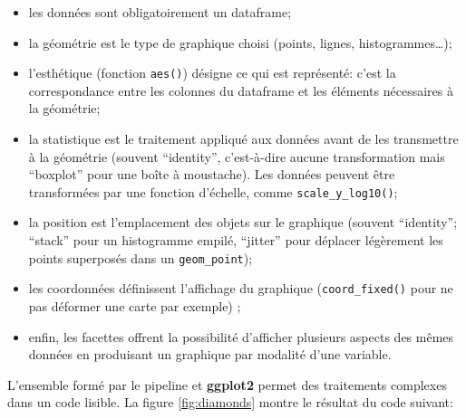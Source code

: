 \documentclass[
  12pt,
  french,
  a4paper,
  extrafontsizes,onecolumn,openright
  ]{memoir}
\newenvironment{Shaded}{\begin{snugshade}}{\end{snugshade}}
\newcommand{\CommentTok}[1]{\textcolor[rgb]{0.56,0.35,0.01}{\textit{#1}}}
\newcommand{\DataTypeTok}[1]{\textcolor[rgb]{0.13,0.29,0.53}{#1}}
\newcommand{\FloatTok}[1]{\textcolor[rgb]{0.00,0.00,0.81}{#1}}
\newcommand{\KeywordTok}[1]{\textcolor[rgb]{0.13,0.29,0.53}{\textbf{#1}}}
\newcommand{\NormalTok}[1]{#1}
\newcommand{\OperatorTok}[1]{\textcolor[rgb]{0.81,0.36,0.00}{\textbf{#1}}}
\newcommand{\StringTok}[1]{\textcolor[rgb]{0.31,0.60,0.02}{#1}}
\providecommand{\tightlist}{%
  \setlength{\itemsep}{0pt}\setlength{\parskip}{0pt}}
\begin{document}
\begin{itemize}
\tightlist
\item
  les données sont obligatoirement un dataframe;
\item
  la géométrie est le type de graphique choisi (points, lignes, histogrammes\ldots);
\item
  l'esthétique (fonction \texttt{aes()}) désigne ce qui est représenté: c'est la correspondance entre les colonnes du dataframe et les éléments nécessaires à la géométrie;
\item
  la statistique est le traitement appliqué aux données avant de les transmettre à la géométrie (souvent \enquote{identity}, c'est-à-dire aucune transformation mais \enquote{boxplot} pour une boîte à moustache).
  Les données peuvent être transformées par une fonction d'échelle, comme \texttt{scale\_y\_log10()};
\item
  la position est l'emplacement des objets sur le graphique (souvent \enquote{identity}; \enquote{stack} pour un histogramme empilé, \enquote{jitter} pour déplacer légèrement les points superposés dans un \texttt{geom\_point});
\item
  les coordonnées définissent l'affichage du graphique (\texttt{coord\_fixed()} pour ne pas déformer une carte par exemple) ;
\item
  enfin, les facettes offrent la possibilité d'afficher plusieurs aspects des mêmes données en produisant un graphique par modalité d'une variable.
\end{itemize}

L'ensemble formé par le pipeline et \textbf{ggplot2} permet des traitements complexes dans un code lisible.
La figure \ref{fig:diamonds} montre le résultat du code suivant:



\scriptsize

\begin{Shaded}
\end{Shaded}
\end{document}
